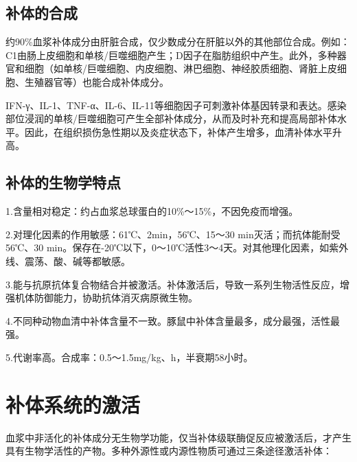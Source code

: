 \subsection{补体的合成}

约90\%血浆补体成分由肝脏合成，仅少数成分在肝脏以外的其他部位合成。例如：C1由肠上皮细胞和单核/巨噬细胞产生；D因子在脂肪组织中产生。此外，多种器官和细胞（如单核/巨噬细胞、内皮细胞、淋巴细胞、神经胶质细胞、肾脏上皮细胞、生殖器官等）也能合成补体成分。

IFN-γ、IL-1、TNF-α、IL-6、IL-11等细胞因子可刺激补体基因转录和表达。感染部位浸润的单核/巨噬细胞可产生全部补体成分，从而及时补充和提高局部补体水平。因此，在组织损伤急性期以及炎症状态下，补体产生增多，血清补体水平升高。


\subsection{补体的生物学特点}

1.含量相对稳定：约占血浆总球蛋白的10\%～15\%，不因免疫而增强。

2.对理化因素的作用敏感：61℃、2min，56℃、15～30
min灭活；而抗体能耐受56℃、30
min。保存在-20℃以下，0～10℃活性3～4天。对其他理化因素，如紫外线、震荡、酸、碱等都敏感。

3.能与抗原抗体复合物结合并被激活。补体激活后，导致一系列生物活性反应，增强机体防御能力，协助抗体消灭病原微生物。

4.不同种动物血清中补体含量不一致。豚鼠中补体含量最多，成分最强，活性最强。

5.代谢率高。合成率：0.5～1.5mg/kg、h，半衰期58小时。

\section{补体系统的激活}

血浆中非活化的补体成分无生物学功能，仅当补体级联酶促反应被激活后，才产生具有生物学活性的产物。多种外源性或内源性物质可通过三条途径激活补体：

